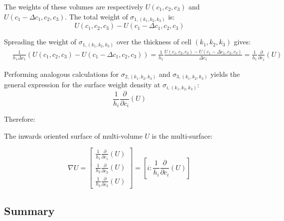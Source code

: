 The weights of these volumes are respectively \(U(c_1, c_2, c_3)\) and \(U(c_1 - \Delta c_1, c_2, c_3)\). The total weight of \(\sigma_{1,(k_1,k_2,k_3)}\) is:
\[U(c_1,c_2,c_3) - U(c_1 - \Delta c_1, c_2, c_3)\]

Spreading the weight of \(\sigma_{1, (k_1,k_2,k_3)}\) over the thickness of cell \((k_1, k_2, k_3)\) gives:
\begin{align*}
& \frac{1}{h_1 \Delta c_1}(U(c_1,c_2,c_3) - U(c_1 - \Delta c_1, c_2, c_3)) 
= \frac{1}{h_1}\frac{U(c_1,c_2,c_3) - U(c_1 - \Delta c_1, c_2, c_3)}{\Delta c_1} 
= \frac{1}{h_1}\frac{\partial}{\partial c_1}(U)
\end{align*}

Performing analogous calculations for \(\sigma_{2, (k_1, k_2, k_3)}\) and \(\sigma_{3, (k_1, k_2, k_3)}\) yields the general expression for the surface weight density at \(\sigma_{i, (k_1, k_2, k_3)}\):
\[\frac{1}{h_i}\frac{\partial}{\partial c_i}(U)\]

Therefore:
\begin{thm}
The inwards oriented surface of multi-volume \(U\) is the multi-surface:

\[\nabla U = \begin{bmatrix} \frac{1}{h_1}\frac{\partial}{\partial c_1}(U) \\ \frac{1}{h_2}\frac{\partial}{\partial c_2}(U) \\ \frac{1}{h_3}\frac{\partial}{\partial c_3}(U) \end{bmatrix} = \left[ i :  \frac{1}{h_i}\frac{\partial}{\partial c_i}(U)\right]\]
\end{thm}



\subsection*{Summary}

